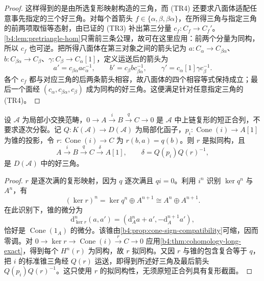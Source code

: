 \begin{proof}
	这样得到的是由所选复形映射构造的三角，而 (TR4) 还要求八面体适配任意事先指定的三个好三角。对每个首箭头 \(f\in\{\alpha,\beta,\beta\alpha\}\)，在所得三角与指定三角的前两项取恒等态射，由已证的 (TR3) 补出第三分量 \(c_f:C_f\to C_f'\)。\cref{b4:lem:pretriangle-hom}只需前三条公理，故可在这里应用：前两个分量为同构，所以 \(c_f\) 也可逆。把所得八面体在第三对象之间的箭头记为 \(a:C_\alpha\to C_{\beta\alpha}\)、\(b:C_{\beta\alpha}\to C_\beta\)、\(\gamma:C_\beta\to C_\alpha[1]\)，定义运送后的箭头为
	\[
		a'=c_{\beta\alpha}a c_\alpha^{-1},\qquad b'=c_\beta b c_{\beta\alpha}^{-1},\qquad \gamma'=c_\alpha[1]\gamma c_\beta^{-1}.
	\]
	各个 \(c_f\) 都与对应三角的后两条箭头相容，故八面体的四个相容等式保持成立；最后一个面经 \((c_\alpha,c_{\beta\alpha},c_\beta)\) 成为同构的好三角。这便满足针对任意指定三角的 (TR4)。
\end{proof}

\begin{proposition}\label{b4:prop:derived-short-exact-triangle}
	设 \(\mathcal A\) 为局部小交换范畴，\(0\to A\xrightarrow{i}B\xrightarrow{q}C\to0\) 是 \(\mathcal A\) 中上链复形的短正合列，不要求逐次分裂。记 \(Q:K(\mathcal A)\to D(\mathcal A)\) 为局部化函子，\(p_i:\operatorname{Cone}(i)\to A[1]\) 为锥的投影，令 \(r:\operatorname{Cone}(i)\to C\) 为 \(r(b,a)=q(b)\)。则 \(r\) 是拟同构，且
	\[
		A\xrightarrow{i}B\xrightarrow{q}C\xrightarrow{\delta}A[1], \qquad\delta=Q(p_i)Q(r)^{-1},
	\]
	是 \(D(\mathcal A)\) 中的好三角。
\end{proposition}
\begin{proof}
	\(r\) 是逐次满的复形映射，因为 \(q\) 逐次满且 \(qi=0\)。利用 \(i^n\) 识别 \(\ker q^n\) 与 \(A^n\)，有
	\[
		(\ker r)^n=\ker q^n\oplus A^{n+1} \cong A^n\oplus A^{n+1}.
	\]
	在此识别下，锥的微分为
	\[
		\mathrm{d}_{\ker r}^n(a,a') =(\mathrm{d}_A^na+a',-\mathrm{d}_A^{n+1}a'),
	\]
	恰好是 \(\operatorname{Cone}(1_A)\) 的微分。该锥由\cref{b4:prop:cone-sign-compatibility}可缩，因而零调。对 \(0\to\ker r\to\operatorname{Cone}(i)\xrightarrow{r}C\to0\) 应用\cref{b4:thm:cohomology-long-exact}，得到每个 \(H^n(r)\) 为同构，故 \(r\) 拟同构。又因 \(r\) 与锥的包含复合等于 \(q\)，把 \(i\) 的标准锥三角经 \(Q(r)\) 运送，即得到所述好三角及最后箭头 \(Q(p_i)Q(r)^{-1}\)。这只使用 \(r\) 的拟同构性，无须原短正合列具有复形截面。
\end{proof}

